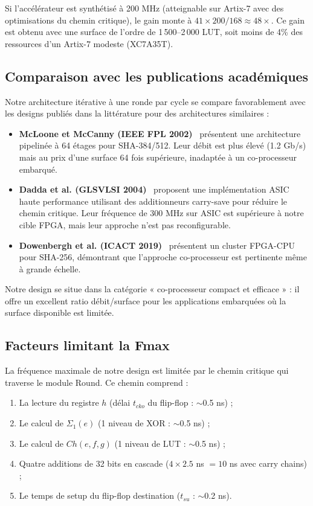 Si l'accélérateur est synthétisé à 200 MHz (atteignable sur Artix-7 avec des optimisations du chemin critique), le gain monte à $41 \times 200/168 \approx 48\times$. Ce gain est obtenu avec une surface de l'ordre de 1\,500--2\,000 LUT, soit moins de 4\% des ressources d'un Artix-7 modeste (XC7A35T).

\subsection{Comparaison avec les publications académiques}

Notre architecture itérative à une ronde par cycle se compare favorablement avec les designs publiés dans la littérature pour des architectures similaires :

\begin{itemize}
    \item \textbf{McLoone et McCanny (IEEE FPL 2002)}~\cite{mcloone} présentent une architecture pipelinée à 64 étages pour SHA-384/512. Leur débit est plus élevé (1.2 Gb/s) mais au prix d'une surface 64 fois supérieure, inadaptée à un co-processeur embarqué.
    \item \textbf{Dadda et al. (GLSVLSI 2004)}~\cite{dadda} proposent une implémentation ASIC haute performance utilisant des additionneurs carry-save pour réduire le chemin critique. Leur fréquence de 300 MHz sur ASIC est supérieure à notre cible FPGA, mais leur approche n'est pas reconfigurable.
    \item \textbf{Dowenbergh et al. (ICACT 2019)}~\cite{icact2019} présentent un cluster FPGA-CPU pour SHA-256, démontrant que l'approche co-processeur est pertinente même à grande échelle.
\end{itemize}

Notre design se situe dans la catégorie « co-processeur compact et efficace » : il offre un excellent ratio débit/surface pour les applications embarquées où la surface disponible est limitée.

\subsection{Facteurs limitant la Fmax}

La fréquence maximale de notre design est limitée par le chemin critique qui traverse le module Round. Ce chemin comprend :

\begin{enumerate}
    \item La lecture du registre $h$ (délai $t_{cko}$ du flip-flop : $\sim$0.5 ns) ;
    \item Le calcul de $\Sigma_1(e)$ (1 niveau de XOR : $\sim$0.5 ns) ;
    \item Le calcul de $Ch(e,f,g)$ (1 niveau de LUT : $\sim$0.5 ns) ;
    \item Quatre additions de 32 bits en cascade ($4 \times 2.5$ ns $= 10$ ns avec carry chains) ;
    \item Le temps de setup du flip-flop destination ($t_{su}$ : $\sim$0.2 ns).
\end{enumerate}

